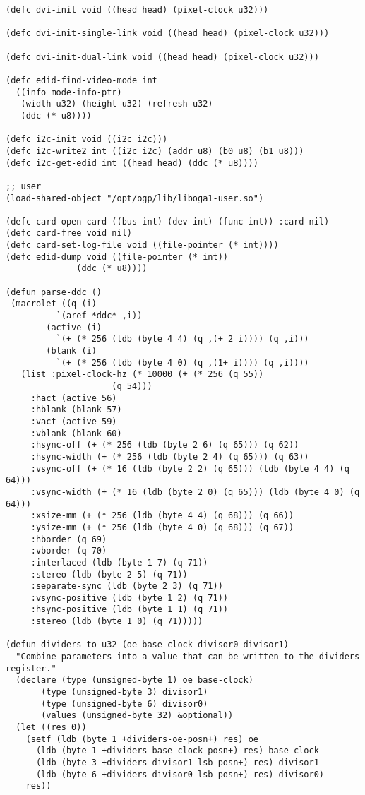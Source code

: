 \documentclass[%
  DIV19]{scrartcl}
\begin{document}
\begin{lstlisting}[label=some-code,caption=SBCL Code to talk to graphics card]
(defc dvi-init void ((head head) (pixel-clock u32)))

(defc dvi-init-single-link void ((head head) (pixel-clock u32)))

(defc dvi-init-dual-link void ((head head) (pixel-clock u32)))

(defc edid-find-video-mode int
  ((info mode-info-ptr)
   (width u32) (height u32) (refresh u32)
   (ddc (* u8))))

(defc i2c-init void ((i2c i2c)))
(defc i2c-write2 int ((i2c i2c) (addr u8) (b0 u8) (b1 u8)))
(defc i2c-get-edid int ((head head) (ddc (* u8))))

;; user
(load-shared-object "/opt/ogp/lib/liboga1-user.so")

(defc card-open card ((bus int) (dev int) (func int)) :card nil)
(defc card-free void nil)
(defc card-set-log-file void ((file-pointer (* int))))
(defc edid-dump void ((file-pointer (* int))
		      (ddc (* u8))))

(defun parse-ddc ()
 (macrolet ((q (i)
	      `(aref *ddc* ,i))
	    (active (i)
	      `(+ (* 256 (ldb (byte 4 4) (q ,(+ 2 i)))) (q ,i)))
	    (blank (i)
	      `(+ (* 256 (ldb (byte 4 0) (q ,(1+ i)))) (q ,i))))
   (list :pixel-clock-hz (* 10000 (+ (* 256 (q 55))
				     (q 54)))
	 :hact (active 56)
	 :hblank (blank 57)
	 :vact (active 59)
	 :vblank (blank 60)
	 :hsync-off (+ (* 256 (ldb (byte 2 6) (q 65))) (q 62))
	 :hsync-width (+ (* 256 (ldb (byte 2 4) (q 65))) (q 63))
	 :vsync-off (+ (* 16 (ldb (byte 2 2) (q 65))) (ldb (byte 4 4) (q 64)))
	 :vsync-width (+ (* 16 (ldb (byte 2 0) (q 65))) (ldb (byte 4 0) (q 64)))
	 :xsize-mm (+ (* 256 (ldb (byte 4 4) (q 68))) (q 66))
	 :ysize-mm (+ (* 256 (ldb (byte 4 0) (q 68))) (q 67))
	 :hborder (q 69)
	 :vborder (q 70)
	 :interlaced (ldb (byte 1 7) (q 71))
	 :stereo (ldb (byte 2 5) (q 71))
	 :separate-sync (ldb (byte 2 3) (q 71))
	 :vsync-positive (ldb (byte 1 2) (q 71))
	 :hsync-positive (ldb (byte 1 1) (q 71))
	 :stereo (ldb (byte 1 0) (q 71)))))

(defun dividers-to-u32 (oe base-clock divisor0 divisor1)
  "Combine parameters into a value that can be written to the dividers
register."
  (declare (type (unsigned-byte 1) oe base-clock)
	   (type (unsigned-byte 3) divisor1) 
	   (type (unsigned-byte 6) divisor0) 
	   (values (unsigned-byte 32) &optional))
  (let ((res 0))
    (setf (ldb (byte 1 +dividers-oe-posn+) res) oe
	  (ldb (byte 1 +dividers-base-clock-posn+) res) base-clock
	  (ldb (byte 3 +dividers-divisor1-lsb-posn+) res) divisor1
	  (ldb (byte 6 +dividers-divisor0-lsb-posn+) res) divisor0)
    res))


\end{lstlisting}
\end{document}
